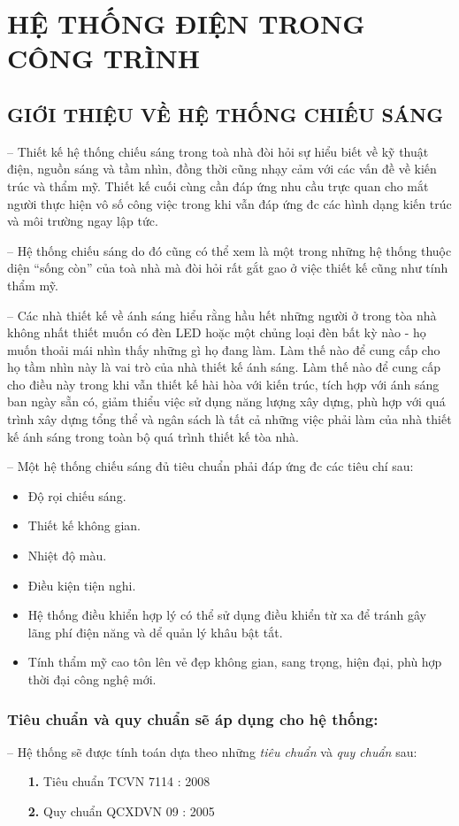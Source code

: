 	\section{HỆ THỐNG ĐIỆN TRONG CÔNG TRÌNH}
	\subsection{GIỚI THIỆU VỀ HỆ THỐNG CHIẾU SÁNG}	
	-- Thiết kế hệ thống chiếu sáng trong toà nhà đòi hỏi sự hiểu biết về kỹ thuật điện, nguồn sáng và tầm nhìn, đồng thời cũng nhạy cảm với các vấn đề về kiến trúc và thẩm mỹ. Thiết kế cuối cùng cần đáp ứng nhu cầu trực quan cho mắt người thực hiện vô số công việc trong khi vẫn đáp ứng đc các hình dạng kiến trúc và môi trường ngay lập tức.
	
	-- Hệ thống chiếu sáng do đó cũng có thể xem là một trong những hệ thống thuộc diện ``sống còn'' của toà nhà mà đòi hỏi rất gắt gao ở việc thiết kế cũng như tính thẩm mỹ.
	
	-- Các nhà thiết kế về ánh sáng hiểu rằng hầu hết những người ở trong tòa nhà không nhất thiết muốn có đèn LED hoặc một chủng loại đèn bất kỳ nào - họ muốn thoải mái nhìn thấy những gì họ đang làm. Làm thế nào để cung cấp cho họ tầm nhìn này là vai trò của nhà thiết kế ánh sáng. Làm thế nào để cung cấp cho điều này trong khi vẫn thiết kế hài hòa với kiến trúc, tích hợp với ánh sáng ban ngày sẵn có, giảm thiểu việc sử dụng năng lượng xây dựng, phù hợp với quá trình xây dựng tổng thể và ngân sách là tất cả những việc phải làm của nhà thiết kế ánh sáng trong toàn bộ quá trình thiết kế tòa nhà.
	
	-- Một hệ thống chiếu sáng đủ tiêu chuẩn phải đáp ứng đc các tiêu chí sau:
	\begin{itemize}[leftmargin=2.5cm]
		\item Độ rọi chiếu sáng.
		\item Thiết kế không gian.
		\item Nhiệt độ màu.
		\item Điều kiện tiện nghi.
		\item Hệ thống điều khiển hợp lý có thể sử dụng điều khiển từ xa để tránh gây lãng phí điện năng và dể quản lý khâu bật tắt.
		\item Tính thẩm mỹ cao tôn lên vẻ đẹp không gian, sang trọng, hiện đại, phù hợp thời đại công nghệ mới.
	\end{itemize}
	\subsubsection{Tiêu chuẩn và quy chuẩn sẽ áp dụng cho hệ thống:}		
	-- Hệ thống sẽ được tính toán dựa theo những \emph{tiêu chuẩn} và \emph{quy chuẩn} sau:
	\begin{itemize}[leftmargin=2cm]
		\item[\textbf{1.}]Tiêu chuẩn TCVN 7114 : 2008 
		\item[\textbf{2.}]Quy chuẩn QCXDVN 09 : 2005
	\end{itemize}	
	
